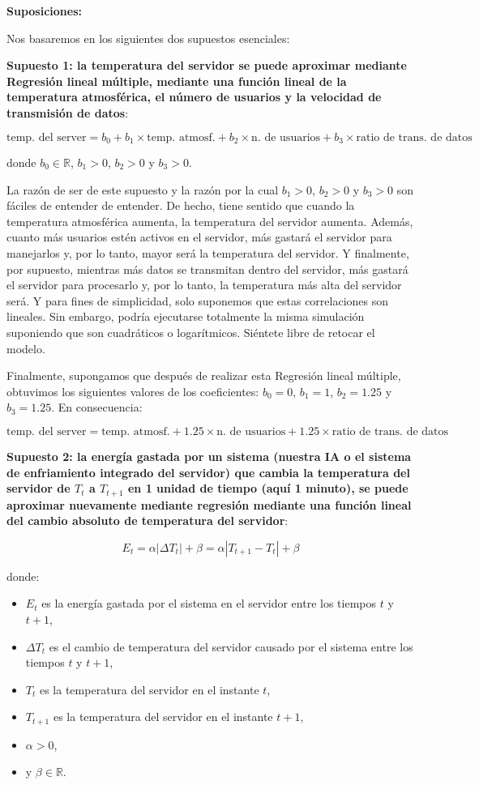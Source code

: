 \documentclass[
]{book}
\providecommand{\tightlist}{%
  \setlength{\itemsep}{0pt}\setlength{\parskip}{0pt}}
\begin{document}
\textbf{Suposiciones:}

Nos basaremos en los siguientes dos supuestos esenciales:

\textbf{Supuesto 1: la temperatura del servidor se puede aproximar mediante Regresión lineal múltiple, mediante una función lineal de la temperatura atmosférica, el número de usuarios y la velocidad de transmisión de datos}:

\[\textrm{temp. del server} = b_0 + b_1 \times \textrm{temp. atmosf.} + b_2 \times \textrm{n. de usuarios} + b_3 \times \textrm{ratio de trans. de datos} \]

donde \(b_0 \in \mathbb{R}\), \(b_1>0\), \(b_2>0\) y \(b_3>0\).

La razón de ser de este supuesto y la razón por la cual \(b_1>0\), \(b_2>0\) y \(b_3>0\) son fáciles de entender de entender. De hecho, tiene sentido que cuando la temperatura atmosférica aumenta, la temperatura del servidor aumenta. Además, cuanto más usuarios estén activos en el servidor, más gastará el servidor para manejarlos y, por lo tanto, mayor será la temperatura del servidor. Y finalmente, por supuesto, mientras más datos se transmitan dentro del servidor, más gastará el servidor para procesarlo y, por lo tanto, la temperatura más alta del servidor será. Y para fines de simplicidad, solo suponemos que estas correlaciones son lineales. Sin embargo, podría ejecutarse totalmente la misma simulación suponiendo que son cuadráticos o logarítmicos. Siéntete libre de retocar el modelo.

Finalmente, supongamos que después de realizar esta Regresión lineal múltiple, obtuvimos los siguientes valores de los coeficientes: \(b_0 = 0\), \(b_1 = 1\), \(b_2 = 1.25\) y \(b_3 = 1.25\). En consecuencia:

\[\textrm{temp. del server} = \textrm{temp. atmosf.} + 1.25 \times \textrm{n. de usuarios} + 1.25 \times \textrm{ratio de trans. de datos} \]

\textbf{Supuesto 2: la energía gastada por un sistema (nuestra IA o el sistema de enfriamiento integrado del servidor) que cambia la temperatura del servidor de \(T_t\) a \(T_{t + 1}\) en 1 unidad de tiempo (aquí 1 minuto), se puede aproximar nuevamente mediante regresión mediante una función lineal del cambio absoluto de temperatura del servidor}:

\[E_t = \alpha |\Delta T_t| + \beta = \alpha |T_{t+1} - T_t| + \beta\]

donde:

\begin{itemize}
\tightlist
\item
  \(E_t\) es la energía gastada por el sistema en el servidor entre los tiempos \(t\) y \(t +1\),
\item
  \(\Delta T_t\) es el cambio de temperatura del servidor causado por el sistema entre los tiempos \(t\) y \(t +1\),
\item
  \(T_t\) es la temperatura del servidor en el instante \(t\),
\item
  \(T_{t + 1}\) es la temperatura del servidor en el instante \(t +1\),
\item
  \(\alpha > 0\),
\item
  y \(\beta \in \mathbb{R}\).
\end{itemize}
\end{document}
